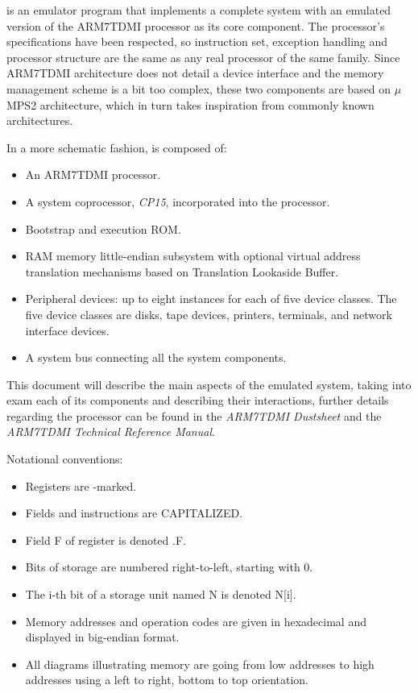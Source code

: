 
\uarm{} is an emulator program that implements a complete system with an emulated version of the ARM7TDMI processor as its core component.
The processor's specifications have been respected, so instruction set, exception handling and processor structure are the same as any real processor of the same family.
Since ARM7TDMI architecture does not detail a device interface and the memory management scheme is a bit too complex, these two components are based on $\mu$MPS2 architecture, which in turn takes inspiration from commonly known architectures.

In a more schematic fashion, \uarm{} is composed of:
\begin{itemize}
	\item An ARM7TDMI processor.
	\item A system coprocessor, \emph{CP15}, incorporated into the processor.
	\item Bootstrap and execution ROM.
	\item RAM memory little-endian subsystem with optional virtual address translation mechanisms based on Translation Lookaside Buffer.
	\item Peripheral devices: up to eight instances for each of five device classes. 
		The five device classes are disks, tape devices, printers, terminals, and network interface devices.
	\item A system bus connecting all the system components.
\end{itemize}

This document will describe the main aspects of the emulated system, taking into exam each of its components and describing their interactions, further details regarding the processor can be found in the \emph{ARM7TDMI Dustsheet} and the \emph{ARM7TDMI Technical Reference Manual}.

Notational conventions:

\begin{itemize}
	\item Registers are -marked.
	\item Fields and instructions are CAPITALIZED.
	\item Field F of register  is denoted .F.
	\item Bits of storage are numbered right-to-left, starting with 0.
	\item The i-th bit of a storage unit named N is denoted N[i].
	\item Memory addresses and operation codes are given in hexadecimal and displayed in big-endian format.
	\item All diagrams illustrating memory are going from low addresses to high addresses using a left to right, bottom to top orientation.
\end{itemize}

